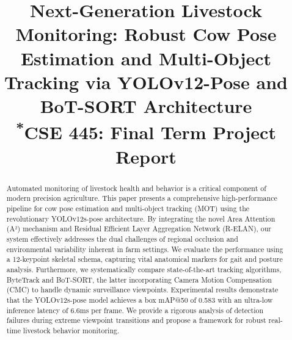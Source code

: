 \documentclass[conference]{IEEEtran}
\begin{document}
\title{Next-Generation Livestock Monitoring: Robust Cow Pose Estimation and Multi-Object Tracking via YOLOv12-Pose and BoT-SORT Architecture\\
{\footnotesize \textsuperscript{*}CSE 445: Final Term Project Report}
}

\author{
\and
{}
\and
{}
\and
{}
}

\maketitle

\begin{abstract}
Automated monitoring of livestock health and behavior is a critical component of modern precision agriculture. This paper presents a comprehensive high-performance pipeline for cow pose estimation and multi-object tracking (MOT) using the revolutionary YOLOv12s-pose architecture. By integrating the novel Area Attention (A²) mechanism and Residual Efficient Layer Aggregation Network (R-ELAN), our system effectively addresses the dual challenges of regional occlusion and environmental variability inherent in farm settings. We evaluate the performance using a 12-keypoint skeletal schema, capturing vital anatomical markers for gait and posture analysis. Furthermore, we systematically compare state-of-the-art tracking algorithms, ByteTrack and BoT-SORT, the latter incorporating Camera Motion Compensation (CMC) to handle dynamic surveillance viewpoints. Experimental results demonstrate that the YOLOv12s-pose model achieves a box mAP@50 of 0.583 with an ultra-low inference latency of 6.6ms per frame. We provide a rigorous analysis of detection failures during extreme viewpoint transitions and propose a framework for robust real-time livestock behavior monitoring.
\end{abstract}
\end{document}
